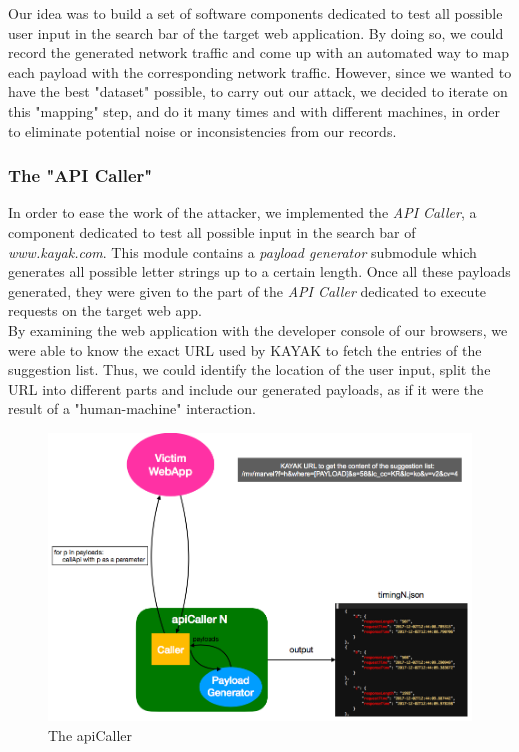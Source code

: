 \documentclass[runningheads]{llncs}
\begin{document}
\medskip

Our idea was to build a set of software components dedicated to test all possible user input in the search bar of the target web application. By doing so, we could record the generated network traffic and come up with an automated way to map each payload with the corresponding network traffic. However, since we wanted to have the best "dataset" possible, to carry out our attack, we decided to iterate on this "mapping" step, and do it many times and with different machines, in order to eliminate potential noise or inconsistencies from our records.

\bigskip

\subsubsection*{The "API Caller"}

In order to ease the work of the attacker, we implemented the \emph{API Caller}, a component dedicated to test all possible input in the search bar of \emph{www.kayak.com}. This module contains a \emph{payload generator} submodule which generates all possible letter strings up to a certain length. Once all these payloads generated, they were given to the part of the \emph{API Caller} dedicated to execute requests on the target web app. \\

By examining the web application with the developer console of our browsers, we were able to know the exact URL used by KAYAK to fetch the entries of the suggestion list. Thus, we could identify the location of the user input, split the URL into different parts and include our generated payloads, as if it were the result of a "human-machine" interaction.

\begin{figure}[h]
\centering
\includegraphics[width=\textwidth]{images/apiCaller.png}
\caption{The apiCaller}
\label{fig:apiCaller}
\end{figure}
\end{document}
